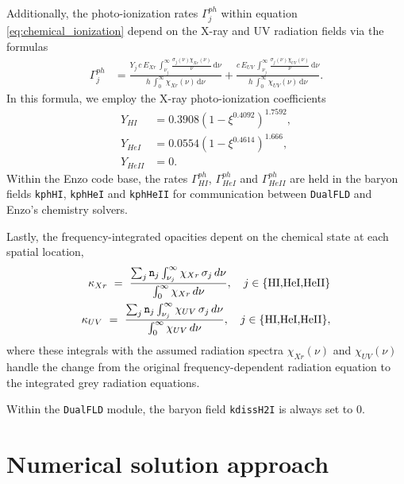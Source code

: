 \documentclass[letterpaper,10pt]{article}
\renewcommand{\(}{\left(}
\renewcommand{\)}{\right)}
\newcommand{\mn}{{\tt n}}
\begin{document}
Additionally, the photo-ionization rates $\Gamma_{j}^{ph}$ within
equation \eqref{eq:chemical_ionization} depend on the X-ray and UV
radiation fields via the formulas
\begin{align}
\label{eq:Gamma}
  \Gamma_j^{ph} &= \frac{Y_{j}\, c\, E_{Xr}\, \int_{\nu_j}^{\infty}
    \frac{\sigma_j(\nu) \chi_{Xr}(\nu)}{\nu}\,\mathrm d\nu}{h\,
    \int_{0}^{\infty} \chi_{Xr}(\nu)\,\mathrm d\nu} 
  + \frac{c\, E_{UV}\, \int_{\nu_j}^{\infty}
    \frac{\sigma_j(\nu) \chi_{UV}(\nu)}{\nu}\,\mathrm d\nu}{h\,
    \int_{0}^{\infty} \chi_{UV}(\nu)\,\mathrm d\nu}.
\end{align}
In this formula, we employ the X-ray photo-ionization coefficients
\begin{align}
\label{eq:YH}
  Y_{HI} &= 0.3908 \left(1 - \xi^{0.4092}\right)^{1.7592}, \\
  Y_{HeI} &= 0.0554 \left(1 - \xi^{0.4614}\right)^{1.666}, \\
  Y_{HeII} &= 0.
\end{align}
Within the Enzo code base, the rates $\Gamma_{HI}^{ph}$,
$\Gamma_{HeI}^{ph}$ and $\Gamma_{HeII}^{ph}$ are held in the baryon fields
{\tt kphHI}, {\tt kphHeI} and {\tt kphHeII} for communication between
{\tt DualFLD} and Enzo's chemistry solvers.

Lastly, the frequency-integrated opacities depent on the chemical
state at each spatial location,
\begin{align}
\label{eq:opacityXr}
  \kappa_{Xr} \ = \ \frac{\sum_{j} 
  \mn_{j} \int_{\nu_{j}}^{\infty} \chi_{Xr}\,\sigma_{j}\,d\nu}{
  \int_{0}^{\infty} \chi_{Xr}\,d\nu}, \quad j\in\{\text{HI,HeI,HeII}\}
  \\
\label{eq:opacityUV}
  \kappa_{UV} \ = \ \frac{\sum_{j} 
  \mn_{j} \int_{\nu_{j}}^{\infty} \chi_{UV}\,\sigma_{j}\,d\nu}
  {\int_{0}^{\infty} \chi_{UV}\,d\nu}, \quad j\in\{\text{HI,HeI,HeII}\},
\end{align}
where these integrals with the assumed radiation spectra $\chi_{Xr}(\nu)$
and  $\chi_{UV}(\nu)$ handle the change from the original
frequency-dependent radiation equation to the integrated grey
radiation equations.


Within the {\tt DualFLD} module, the baryon field {\tt kdissH2I}
is always set to 0. 





\section{Numerical solution approach}
\label{sec:solution_approach}
\end{document}
